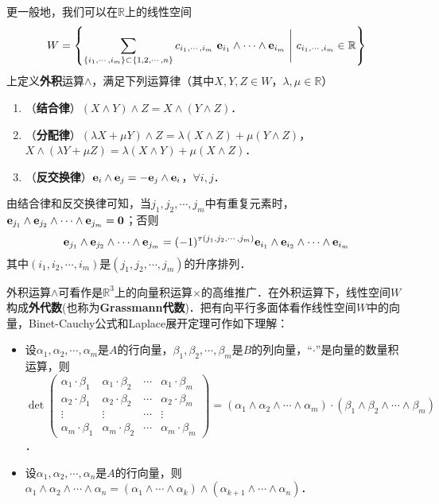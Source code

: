 \documentclass[a4paper,fontset=windows]{ctexbook}
\theoremstyle{definition}
\begin{document}
更一般地，我们可以在$\mathbb{R}$上的线性空间
$$W=\left\{\sum_{\{i_1,\cdots,i_m\}\subset\{1,2,\cdots,n\}}c_{i_1,\cdots,i_m}~{\bf e}_{i_1}\wedge\cdots\wedge{\bf e}_{i_m}~\Biggl|~c_{i_1,\cdots,i_m}\in\mathbb{R}\right\}$$
上定义{\bf 外积}运算$\wedge$，满足下列运算律（其中$X,Y,Z\in W$，$\lambda,\mu\in\mathbb{R}$）
\begin{enumerate}
\item（{\bf 结合律}）$(X\wedge Y)\wedge Z=X\wedge(Y\wedge Z)$．

\item（{\bf 分配律}）$(\lambda X+\mu Y)\wedge Z=\lambda(X\wedge Z)+\mu(Y\wedge Z)$，$X\wedge(\lambda Y+\mu Z)=\lambda(X\wedge Y)+\mu(X\wedge Z)$．

\item（{\bf 反交换律}）${\bf e}_i\wedge{\bf e}_j=-{\bf e}_j\wedge{\bf e}_i$，$\forall i,j$．
\end{enumerate}

由结合律和反交换律可知，当$j_1,j_2,\cdots,j_m$中有重复元素时，${\bf e}_{j_1}\wedge{\bf e}_{j_2}\wedge\cdots\wedge{\bf e}_{j_m}={\bf 0}$；否则
$${\bf e}_{j_1}\wedge{\bf e}_{j_2}\wedge\cdots\wedge{\bf e}_{j_m}=(-1)^{\tau(j_1,j_2,\cdots,j_m)}{\bf e}_{i_1}\wedge{\bf e}_{i_2}\wedge\cdots\wedge{\bf e}_{i_m}$$
其中$(i_1,i_2,\cdots,i_m)$是$(j_1,j_2,\cdots,j_m)$的升序排列．

\bigskip 外积运算$\wedge$可看作是$\mathbb{R}^3$上的向量积运算$\times$的高维推广．在外积运算下，线性空间$W$构成{\bf 外代数}(也称为{\bf Grassmann}{\bf 代数})．把有向平行多面体看作线性空间$W$中的向量，Binet-Cauchy公式和Laplace展开定理可作如下理解：
\begin{itemize}
\item 设$\alpha_1,\alpha_2,\cdots,\alpha_m$是$A$的行向量，$\beta_1,\beta_2,\cdots,\beta_m$是$B$的列向量，“$\cdot$”是向量的数量积运算，则
$\det\begin{pmatrix}\alpha_1\cdot\beta_1&\alpha_1\cdot\beta_2&\cdots&\alpha_1\cdot\beta_m \\ \alpha_2\cdot\beta_1&\alpha_2\cdot\beta_2&\cdots&\alpha_2\cdot\beta_m \\ \vdots&\vdots&\cdots&\vdots \\ \alpha_m\cdot\beta_1&\alpha_m\cdot\beta_2&\cdots&\alpha_m\cdot\beta_m\end{pmatrix}=(\alpha_1\wedge\alpha_2\wedge\cdots\wedge\alpha_m)\cdot(\beta_1\wedge\beta_2\wedge\cdots\wedge\beta_m)$．

\item 设$\alpha_1,\alpha_2,\cdots,\alpha_n$是$A$的行向量，则$\alpha_1\wedge\alpha_2\wedge\cdots\wedge\alpha_n=(\alpha_1\wedge\cdots\wedge\alpha_k)\wedge(\alpha_{k+1}\wedge\cdots\wedge\alpha_n)$．
\end{itemize}
\end{document}
